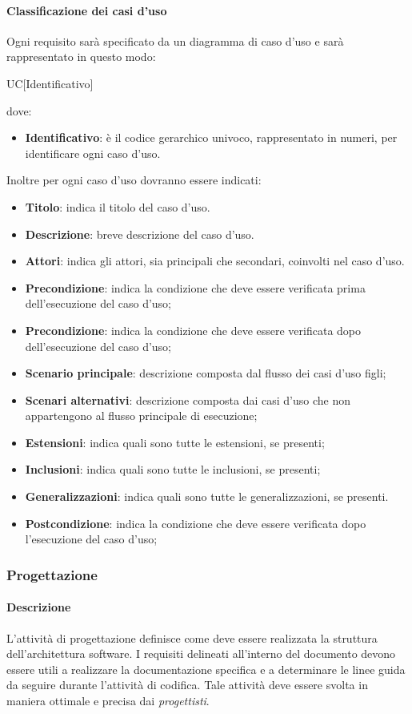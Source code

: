 \paragraph{Classificazione dei casi d'uso}
Ogni requisito sarà specificato da un diagramma di caso d'uso e sarà rappresentato in questo modo:
\begin{center}
  UC[Identificativo]
\end{center}
dove:
\begin{itemize}
  \item\textbf{Identificativo}: è il codice gerarchico univoco, rappresentato in numeri, per identificare ogni caso d'uso.
\end{itemize}
Inoltre per ogni caso d'uso dovranno essere indicati:
\begin{itemize}
  \item\textbf{Titolo}: indica il titolo del caso d'uso.
  \item\textbf{Descrizione}: breve descrizione del caso d'uso.
  \item\textbf{Attori}: indica gli attori, sia principali che secondari, coinvolti nel caso d'uso.
  \item\textbf{Precondizione}: indica la condizione che deve essere verificata prima
  dell'esecuzione del caso d'uso;
   \item\textbf{Precondizione}: indica la condizione che deve essere verificata dopo dell'esecuzione del caso d'uso;
  \item\textbf{Scenario principale}: descrizione composta dal flusso dei casi d'uso
  figli;
  \item\textbf{Scenari alternativi}: descrizione composta dai casi d'uso che non
  appartengono al flusso principale di esecuzione;
  \item\textbf{Estensioni}: indica quali sono tutte le estensioni, se presenti;
  \item\textbf{Inclusioni}: indica quali sono tutte le inclusioni, se presenti;
  \item\textbf{Generalizzazioni}: indica quali sono tutte le generalizzazioni,
  se presenti.
  \item\textbf{Postcondizione}: indica la condizione che deve essere verificata dopo
  l'esecuzione del caso d'uso;
\end{itemize}

\subsubsection{Progettazione}
\paragraph{Descrizione}
L'attività di progettazione definisce come deve essere realizzata la struttura dell'architettura software. I requisiti delineati all'interno del documento \textit{\AdR} devono essere utili a realizzare la documentazione specifica e a determinare le linee guida da seguire durante l'attività di codifica.
Tale attività deve essere svolta in maniera ottimale e precisa dai \textit{progettisti}.

